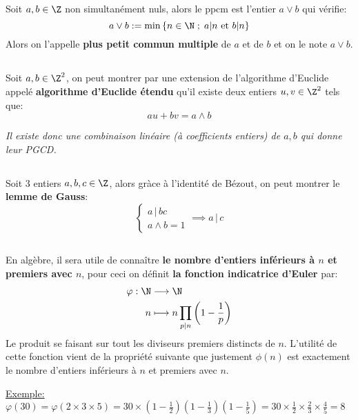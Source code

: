 \subsection*{}
Soit \(a, b \in \Z\) non simultanément nuls, alors le ppcm est l'entier \(a \vee b\) qui vérifie:
\[ 
    a \vee b := \min \left\{ n \in \N \; ; \; a | n \text{ et } b | n \right\} 
\]
Alors on l'appelle \textbf{plus petit commun multiple} de \(a\) et de \(b\) et on le note \(a \vee b\).

\subsection*{}
Soit \(a, b\in \Z^2\), on peut montrer par une extension de l'algorithme d'Euclide appelé \textbf{algorithme d'Euclide étendu} qu'il existe deux entiers \(u, v \in \Z^2\) tels que:
\[
      au + bv = a \wedge b
\]
\begin{center}
   \textit{
       Il existe donc une combinaison linéaire (à coefficients entiers) de \(a, b\) qui donne leur PGCD.
   }
\end{center}
\subsection*{}
Soit 3 entiers \(a, b, c \in \Z\), alors gràce à l'identité de Bézout, on peut montrer le \textbf{lemme de Gauss}:
\[
    \begin{cases} 
        a \, | \, bc \\
        a \wedge b = 1
    \end{cases} \implies a \, | \, c
\]
\subsection*{}
En algèbre, il sera utile de connaître \textbf{le nombre d'entiers inférieurs à \(n\) et premiers avec \(n\)}, pour ceci on définit \textbf{la fonction indicatrice d'Euler} par:
\[
   \begin{aligned}
      \varphi: \N &\longrightarrow \N\\
      n &\longmapsto n \prod_{p|n}{\left(1-\frac{1}{p}\right)}
   \end{aligned}
\]
Le produit se faisant sur tout les diviseurs premiers distincts de \(n\). L'utilité de cette fonction vient de la propriété suivante que justement \( \phi(n) \) est exactement le nombre d'entiers inférieurs à \( n \) et premiers avec \( n \).\<

\underline{Exemple:} \(\varphi(30) = \varphi(2\times3\times5) = 30\times\left(1-\frac{1}{2}\right)\left(1-\frac{1}{3}\right)\left(1-\frac{1}{5}\right) = 30\times\frac{1}{2}\times\frac{2}{3}\times\frac{4}{5} = 8\)

